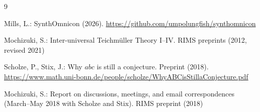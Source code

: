 \documentclass[12pt]{article}
\theoremstyle{plain}
\theoremstyle{definition}
\theoremstyle{remark}
\begin{document}
\begin{thebibliography}{9}

Mills, L.: SynthOmnicon (2026). \url{https://github.com/umpolungfish/synthomnicon}

Mochizuki, S.: Inter-universal Teichm\"uller Theory I--IV. RIMS preprints (2012, revised 2021)

Scholze, P., Stix, J.: Why $abc$ is still a conjecture. Preprint (2018).
\url{https://www.math.uni-bonn.de/people/scholze/WhyABCisStillaConjecture.pdf}

Mochizuki, S.: Report on discussions, meetings, and email correspondences
(March--May 2018 with Scholze and Stix). RIMS preprint (2018)

\end{thebibliography}
\end{document}
